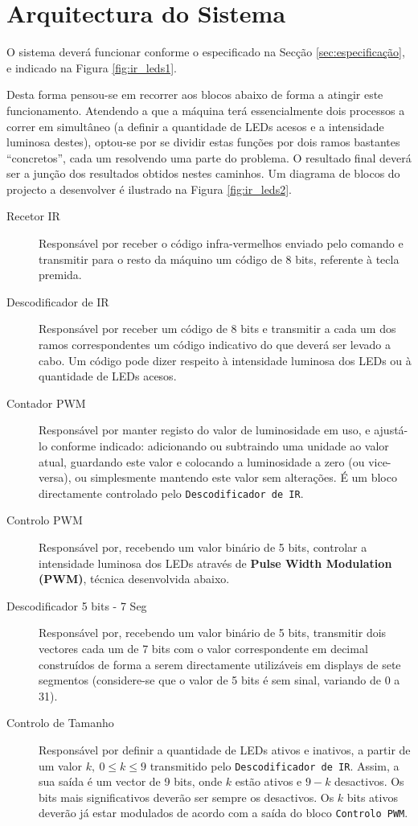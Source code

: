 \documentclass[a4paper,11pt,openright,oneside]{report}
\begin{document}
\section{Arquitectura do Sistema}


O sistema deverá funcionar conforme o especificado na Secção \ref{sec:especificação}, e indicado na Figura \ref{fig:ir_leds1}.

Desta forma pensou-se em recorrer aos blocos abaixo de forma a atingir este funcionamento. Atendendo a que a máquina terá essencialmente dois processos a correr em simultâneo (a definir a quantidade de LEDs acesos e a intensidade luminosa destes), optou-se por se dividir estas funções por dois ramos bastantes ``concretos'', cada um resolvendo uma parte do problema. O resultado final deverá ser a junção  dos resultados obtidos nestes caminhos. Um diagrama de blocos do projecto a desenvolver é ilustrado na Figura \ref{fig:ir_leds2}.

\begin{description}
\item[Recetor IR] Responsável por receber o código infra-vermelhos enviado pelo comando e transmitir para o resto da máquino um código de 8 bits, referente à tecla premida.
\item[Descodificador de IR] Responsável por receber um código de 8 bits e transmitir a cada um dos ramos correspondentes um código indicativo do que deverá ser levado a cabo. Um código pode dizer respeito à intensidade luminosa dos LEDs ou à quantidade de LEDs acesos.
\item[Contador PWM] Responsável por manter registo do valor de luminosidade em uso, e ajustá-lo conforme indicado: adicionando ou subtraindo uma unidade ao valor atual, guardando este valor e colocando a luminosidade a zero (ou vice-versa), ou simplesmente mantendo este valor sem alterações. É um bloco directamente controlado pelo \verb|Descodificador de IR|.
\item[Controlo PWM] Responsável por, recebendo um valor binário de 5 bits, controlar a intensidade luminosa dos LEDs através de \textbf{Pulse Width Modulation (PWM)}, técnica desenvolvida abaixo.
\item[Descodificador 5 bits - 7 Seg] Responsável por, recebendo um valor binário de 5 bits, transmitir dois vectores cada um de 7 bits com o valor correspondente em decimal construídos de forma a serem directamente utilizáveis em displays de sete segmentos (considere-se que o valor de 5 bits é sem sinal, variando de 0 a 31).
\item[Controlo de Tamanho] Responsável por definir a quantidade de LEDs ativos e inativos, a partir de um valor $k,\ 0 \leq k \leq 9$ transmitido pelo \verb|Descodificador de IR|. Assim, a sua saída é um vector de 9 bits, onde $k$ estão ativos e $9 - k$ desactivos. Os bits mais significativos deverão ser sempre os desactivos. Os $k$ bits ativos deverão já estar modulados de acordo com a saída do bloco \verb|Controlo PWM|. 
\end{description}
\end{document}
